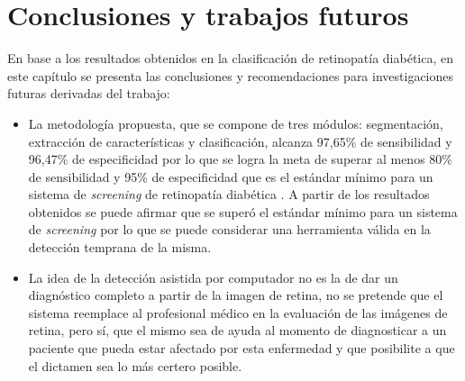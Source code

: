\newpage{\ } 
\thispagestyle{empty} 

\chapter{Conclusiones y trabajos futuros}
En base a los resultados obtenidos en la clasificación de retinopatía diabética, en este capítulo se presenta las conclusiones y recomendaciones para investigaciones futuras derivadas del trabajo:
\begin{itemize}
\section{Conclusiones}
\item La metodología propuesta, que se compone de tres módulos: segmentación, extracción de características y clasificación, alcanza 97,65\% de sensibilidad y 96,47\% de especificidad por lo que se logra la meta de superar al menos 80\% de sensibilidad y 95\% de especificidad que es el estándar mínimo para un sistema de \textit{screening} de retinopatía diabética \cite{guide}. A partir de los resultados obtenidos se puede afirmar que se superó el estándar mínimo para un sistema de \textit{screening} por lo que se puede considerar una herramienta válida en la detección temprana de la misma.

\item La idea de la detección asistida por computador no es la de dar un diagnóstico completo a partir de la imagen de retina, no se pretende que el sistema reemplace al profesional médico en la evaluación de las imágenes de retina, pero sí, que el mismo sea de ayuda al momento de diagnosticar a un paciente que pueda estar afectado por esta enfermedad y que posibilite a que el dictamen sea lo más certero posible.
 


\end{itemize}
